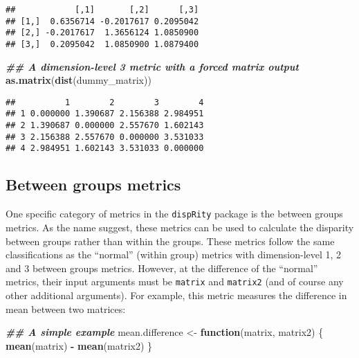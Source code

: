 \documentclass[
]{book}
\newenvironment{Shaded}{\begin{snugshade}}{\end{snugshade}}
\newcommand{\ControlFlowTok}[1]{\textcolor[rgb]{0.13,0.29,0.53}{\textbf{#1}}}
\newcommand{\DocumentationTok}[1]{\textcolor[rgb]{0.56,0.35,0.01}{\textbf{\textit{#1}}}}
\newcommand{\FunctionTok}[1]{\textcolor[rgb]{0.13,0.29,0.53}{\textbf{#1}}}
\newcommand{\NormalTok}[1]{#1}
\newcommand{\OtherTok}[1]{\textcolor[rgb]{0.56,0.35,0.01}{#1}}
\newcommand{\SpecialCharTok}[1]{\textcolor[rgb]{0.81,0.36,0.00}{\textbf{#1}}}
\begin{document}
\begin{verbatim}
##            [,1]       [,2]      [,3]
## [1,]  0.6356714 -0.2017617 0.2095042
## [2,] -0.2017617  1.3656124 1.0850900
## [3,]  0.2095042  1.0850900 1.0879400
\end{verbatim}

\begin{Shaded}
\begin{Highlighting}[]
\DocumentationTok{\#\# A dimension{-}level 3 metric with a forced matrix output}
\FunctionTok{as.matrix}\NormalTok{(}\FunctionTok{dist}\NormalTok{(dummy\_matrix))}
\end{Highlighting}
\end{Shaded}

\begin{verbatim}
##          1        2        3        4
## 1 0.000000 1.390687 2.156388 2.984951
## 2 1.390687 0.000000 2.557670 1.602143
## 3 2.156388 2.557670 0.000000 3.531033
## 4 2.984951 1.602143 3.531033 0.000000
\end{verbatim}

\hypertarget{betweengroupmetricsexplain}{%
\subsection{Between groups metrics}\label{betweengroupmetricsexplain}}

One specific category of metrics in the \texttt{dispRity} package is the between groups metrics.
As the name suggest, these metrics can be used to calculate the disparity between groups rather than within the groups.
These metrics follow the same classifications as the ``normal'' (within group) metrics with dimension-level 1, 2 and 3 between groups metrics.
However, at the difference of the ``normal'' metrics, their input arguments must be \texttt{matrix} and \texttt{matrix2} (and of course any other additional arguments).
For example, this metric measures the difference in mean between two matrices:

\begin{Shaded}
\begin{Highlighting}[]
\DocumentationTok{\#\# A simple example}
\NormalTok{mean.difference }\OtherTok{\textless{}{-}} \ControlFlowTok{function}\NormalTok{(matrix, matrix2) \{}
  \FunctionTok{mean}\NormalTok{(matrix) }\SpecialCharTok{{-}} \FunctionTok{mean}\NormalTok{(matrix2)}
\NormalTok{\}}
\end{Highlighting}
\end{Shaded}
\end{document}
